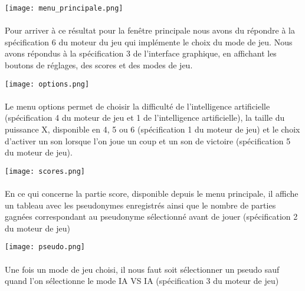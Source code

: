 \documentclass[a4paper,oneside]{article}
\begin{document}
\begin{center}
\texttt{[image: menu\_principale.png]}
\end{center}

\paragraph{}
Pour arriver à ce résultat pour la fenêtre principale nous avons du répondre à la spécification 6 du moteur du jeu qui implémente le choix du mode de jeu. 
Nous avons répondus à la spécification 3 de l'interface graphique, en affichant les boutons de réglages, des scores et des modes de jeu.


\begin{center}
\texttt{[image: options.png]}
\end{center}

\paragraph{}
Le menu options permet de choisir la difficulté de l'intelligence artificielle (spécification 4 du moteur de jeu et 1 de l'intelligence artificielle), la taille du puissance X, disponible en 4, 5 ou 6 (spécification 1 du moteur de jeu) et le choix d'activer un son lorsque l'on joue un coup et un son de victoire (spécification 5 du moteur de jeu).
\vspace{2cm}

\begin{center}
	\texttt{[image: scores.png]}
\end{center}

\paragraph{}
En ce qui concerne la partie score, disponible depuis le menu principale, il affiche un tableau avec les pseudonymes enregistrés ainsi que le nombre de parties gagnées correspondant au pseudonyme sélectionné avant de jouer (spécification 2 du moteur de jeu)

\begin{center}
	\texttt{[image: pseudo.png]}
\end{center}

\paragraph{}
Une fois un mode de jeu choisi, il nous faut soit sélectionner un pseudo sauf quand l'on sélectionne le mode IA VS IA (spécification 3 du moteur de jeu)
\end{document}
